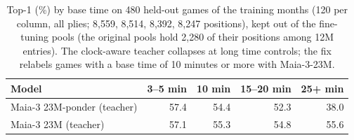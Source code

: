 \begin{table}[t]\centering\small
\caption{Top-1 (\%) by base time on 480 held-out games of the training months (120 per column, all plies; 8,559, 8,514, 8,392, 8,247 positions), kept out of the fine-tuning pools (the original pools hold 2,280 of their positions among 12M entries). The clock-aware teacher collapses at long time controls; the fix relabels games with a base time of 10 minutes or more with Maia-3-23M.}\label{tab:tcfix}
\begin{tabular}{lrrrr}\toprule
Model & 3--5 min & 10 min & 15--20 min & 25+ min\\\midrule
Maia-3 23M-ponder (teacher) & 57.4 & 54.4 & 52.3 & 38.0 \\
Maia-3 23M (teacher) & 57.1 & 55.3 & 54.8 & 55.6 \\
\bottomrule\end{tabular}\end{table}
